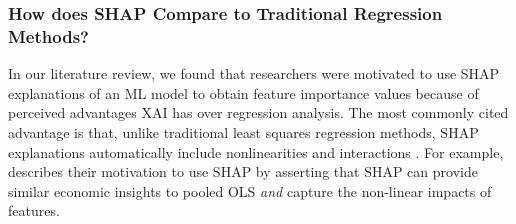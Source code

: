 \documentclass[mnsc,blindrev]{informs3}
\begin{document}
\subsubsection{How does SHAP Compare to Traditional Regression Methods?}
    In our literature review, we found that researchers were motivated to use SHAP explanations of an ML model to obtain feature importance values because of perceived advantages XAI has over regression analysis. The most commonly cited advantage is that, unlike traditional least squares regression methods, SHAP explanations automatically include nonlinearities and interactions \cite{hanauer22boosting,berger2023supply,srivastava23energy,banulescu2023practical,li24roles}. For example, \cite{berger2023supply} describes their motivation to use SHAP by asserting that SHAP can provide similar economic insights to pooled OLS \emph{and} capture the non-linear impacts of features. 
    
\end{document}
